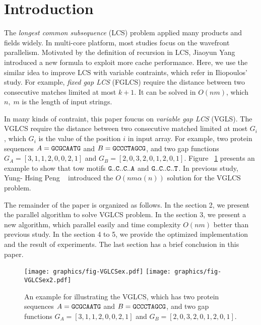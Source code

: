 \section{Introduction} %
\label{sec:Introduction}

The \emph{longest common subsequence} (LCS) problem applied many
products and fields widely.  In multi-core platform, most studies
focus on the wavefront parallelism. Motivated by the definition of
recursion in LCS, Jiaoyun Yang introduced a new formula to exploit
more cache performance.  Here, we use the similar idea to improve LCS
with variable contraints, which refer in Iliopoulos' study.  For
example, \emph{fixed gap LCS} (FGLCS) require the distance between two
consecutive matches limited at most $k+1$.  It can be solved in
$O(nm)$, which $n, \; m$ is the length of input strings.

In many kinds of contraint, this paper foucus on \emph{variable gap
LCS} (VGLS). The VGLCS require the distance between two consecutive
matched limited at most $G_i$, which $G_i$ is the value of the
position $i$ in input array. For example, two protein sequences $A =
\tt{GCGCAATG}$ and $B = \tt{GCCCTAGCG}$, and two gap functions $G_A =
[3, 1, 1, 2, 0, 0, 2, 1]$ and $G_B = [2, 0, 3, 2, 0, 1, 2, 0, 1]$.
Figure ~\ref{fig:VGLCSex} presents an example to show that tow motifs
$\tt{G..C..C..A}$ and $\tt{G..C..C..T}$.  In previous study, Yung-
Hsing Peng ~\cite{yunghsing} introduced the $O(nm \alpha(n))$ solution
for the VGLCS problem.

The remainder of the paper is organized as follows. In the section 2,
we present the parallel algorithm to solve VGLCS problem. In the
section 3, we present a new algorithm, which parallel easily and time
complexity $O(nm)$ better than previous study. In the section 4 to 5,
we provide the optimized implementation and the result of experiments.
The last section has a brief conclusion in this paper.

\begin{figure}[!thb]
  \centering
  \texttt{[image: graphics/fig-VGLCSex.pdf]}
  \texttt{[image: graphics/fig-VGLCSex2.pdf]}

  \caption{   An example for illustrating the VGLCS, which has two
protein sequences $A = \tt{GCGCAATG}$ and $B = \tt{GCCCTAGCG}$, and
two gap functions $G_A = [3, 1, 1, 2, 0, 0, 2, 1]$ and $G_B = [2, 0,
3, 2, 0, 1, 2, 0, 1]$.   }
  
  \label{fig:VGLCSex}
\end{figure}